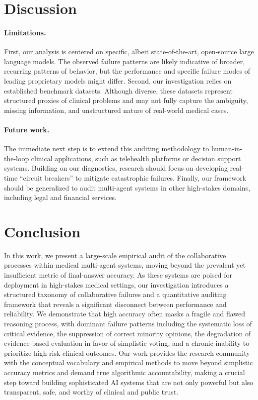 \section{Discussion}

\paragraph{Limitations.}
First, our analysis is centered on specific, albeit state-of-the-art, open-source large language models. The observed failure patterns are likely indicative of broader, recurring patterns of behavior, but the performance and specific failure modes of leading proprietary models might differ. Second, our investigation relies on established benchmark datasets. Although diverse, these datasets represent structured proxies of clinical problems and may not fully capture the ambiguity, missing information, and unstructured nature of real-world medical cases.

\paragraph{Future work.}
The immediate next step is to extend this auditing methodology to human-in-the-loop clinical applications, such as telehealth platforms or decision support systems. Building on our diagnostics, research should focus on developing real-time ``circuit breakers'' to mitigate catastrophic failures. Finally, our framework should be generalized to audit multi-agent systems in other high-stakes domains, including legal and financial services.

\section{Conclusion}

In this work, we present a large-scale empirical audit of the collaborative processes within medical multi-agent systems, moving beyond the prevalent yet insufficient metric of final-answer accuracy. As these systems are poised for deployment in high-stakes medical settings, our investigation introduces a structured taxonomy of collaborative failures and a quantitative auditing framework that reveals a significant disconnect between performance and reliability. We demonstrate that high accuracy often masks a fragile and flawed reasoning process, with dominant failure patterns including the systematic loss of critical evidence, the suppression of correct minority opinions, the degradation of evidence-based evaluation in favor of simplistic voting, and a chronic inability to prioritize high-risk clinical outcomes. Our work provides the research community with the conceptual vocabulary and empirical methods to move beyond simplistic accuracy metrics and demand true algorithmic accountability, making a crucial step toward building sophisticated AI systems that are not only powerful but also transparent, safe, and worthy of clinical and public trust.

